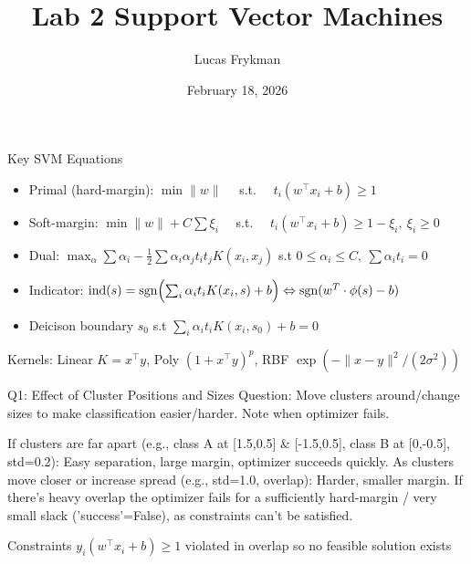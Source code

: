 \documentclass[10pt]{beamer}
\title{Lab 2 Support Vector Machines}
\author{Lucas Frykman}
\date{February 18, 2026}
\begin{document}
\begin{frame}
\titlepage
\end{frame}

\begin{frame}{Key SVM Equations}
\small
\begin{itemize}
\item Primal (hard-margin): $\min \|{w}\| \quad$ s.t. $\quad t_i( {w}^\top{x}_i + b) \ge 1$
\item Soft-margin: \quad $\min \|{w}\| + C\sum\xi_i \quad$ s.t. $\quad t_i({w}^\top{x}_i + b) \ge 1-\xi_i, \ \xi_i\ge0$
\item Dual: \quad $\max_\alpha \sum \alpha_i - \frac{1}{2}\sum\alpha_i\alpha_j t_i t_j K({x}_i,{x}_j)$ s.t $0 \le \alpha_i \le C, \ \sum \alpha_i t_i = 0$
\item Indicator: $ \operatorname{ind}(s) = \operatorname{sgn}\Bigl( \sum_i \alpha_i t_i K({x}_i,{s}) + b \Bigr) \Leftrightarrow \operatorname{sgn} (w^T\cdot \phi(s) -b)$
\item Deicison boundary $s_0$ s.t $\sum_i \alpha_i t_i K({x}_i,{s_0}) + b = 0$
\end{itemize}
Kernels: Linear $K={x}^\top{y}$, Poly $(1+{x}^\top{y})^p$, RBF $\exp(-\|{x}-{y}\|^2/(2\sigma^2))$
\end{frame}


\begin{frame}{Q1: Effect of Cluster Positions and Sizes}
\alert{Question:} Move clusters around/change sizes to make classification easier/harder. Note when optimizer fails.

\vspace{1em}

If clusters are far apart (e.g., class A at [1.5,0.5] \& [-1.5,0.5], class B at [0,-0.5], std=0.2): Easy separation, large margin, optimizer succeeds quickly.
As clusters move closer or increase spread (e.g., std=1.0, overlap): Harder, smaller margin.
If there's heavy overlap the optimizer fails for a sufficiently hard-margin / very small slack ('success'=False), as constraints can't be satisfied.

\vspace{1em}

Constraints $y_i({w}^\top {x}_i + b) \geq 1$ violated in overlap so no feasible solution exists
\end{frame}
\end{document}

